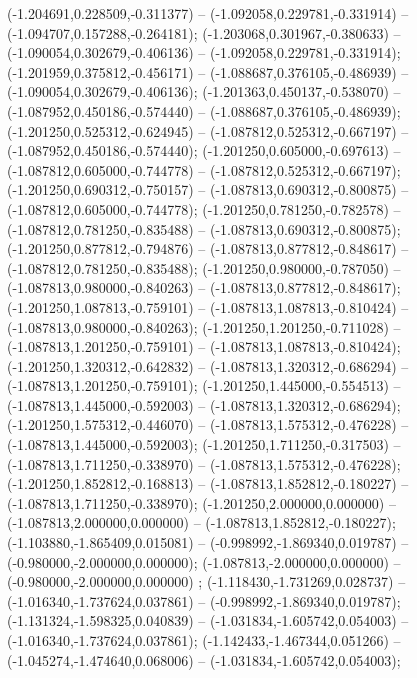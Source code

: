  (-1.204691,0.228509,-0.311377) -- (-1.092058,0.229781,-0.331914) -- (-1.094707,0.157288,-0.264181);
 (-1.203068,0.301967,-0.380633) -- (-1.090054,0.302679,-0.406136) -- (-1.092058,0.229781,-0.331914);
 (-1.201959,0.375812,-0.456171) -- (-1.088687,0.376105,-0.486939) -- (-1.090054,0.302679,-0.406136);
 (-1.201363,0.450137,-0.538070) -- (-1.087952,0.450186,-0.574440) -- (-1.088687,0.376105,-0.486939);
 (-1.201250,0.525312,-0.624945) -- (-1.087812,0.525312,-0.667197) -- (-1.087952,0.450186,-0.574440);
 (-1.201250,0.605000,-0.697613) -- (-1.087812,0.605000,-0.744778) -- (-1.087812,0.525312,-0.667197);
 (-1.201250,0.690312,-0.750157) -- (-1.087813,0.690312,-0.800875) -- (-1.087812,0.605000,-0.744778);
 (-1.201250,0.781250,-0.782578) -- (-1.087812,0.781250,-0.835488) -- (-1.087813,0.690312,-0.800875);
 (-1.201250,0.877812,-0.794876) -- (-1.087813,0.877812,-0.848617) -- (-1.087812,0.781250,-0.835488);
 (-1.201250,0.980000,-0.787050) -- (-1.087813,0.980000,-0.840263) -- (-1.087813,0.877812,-0.848617);
 (-1.201250,1.087813,-0.759101) -- (-1.087813,1.087813,-0.810424) -- (-1.087813,0.980000,-0.840263);
 (-1.201250,1.201250,-0.711028) -- (-1.087813,1.201250,-0.759101) -- (-1.087813,1.087813,-0.810424);
 (-1.201250,1.320312,-0.642832) -- (-1.087813,1.320312,-0.686294) -- (-1.087813,1.201250,-0.759101);
 (-1.201250,1.445000,-0.554513) -- (-1.087813,1.445000,-0.592003) -- (-1.087813,1.320312,-0.686294);
 (-1.201250,1.575312,-0.446070) -- (-1.087813,1.575312,-0.476228) -- (-1.087813,1.445000,-0.592003);
 (-1.201250,1.711250,-0.317503) -- (-1.087813,1.711250,-0.338970) -- (-1.087813,1.575312,-0.476228);
 (-1.201250,1.852812,-0.168813) -- (-1.087813,1.852812,-0.180227) -- (-1.087813,1.711250,-0.338970);
 (-1.201250,2.000000,0.000000) -- (-1.087813,2.000000,0.000000) -- (-1.087813,1.852812,-0.180227);
 (-1.103880,-1.865409,0.015081) -- (-0.998992,-1.869340,0.019787) -- (-0.980000,-2.000000,0.000000);
 (-1.087813,-2.000000,0.000000) -- (-0.980000,-2.000000,0.000000) ;
 (-1.118430,-1.731269,0.028737) -- (-1.016340,-1.737624,0.037861) -- (-0.998992,-1.869340,0.019787);
 (-1.131324,-1.598325,0.040839) -- (-1.031834,-1.605742,0.054003) -- (-1.016340,-1.737624,0.037861);
 (-1.142433,-1.467344,0.051266) -- (-1.045274,-1.474640,0.068006) -- (-1.031834,-1.605742,0.054003);
